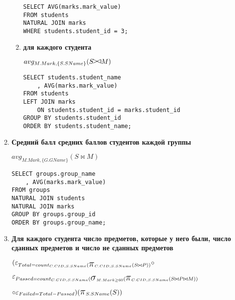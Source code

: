 \documentclass[12pt]{article}
\newcommand{\select}{\mbox{\Large$\sigma$}}
\newcommand{\rightsemijoin}{\mbox{$\mathrel{\raise1pt\hbox{\hskip-1.5pt$>$\hskip -2.5pt$<$\hskip -1.1pt\vrule height5pt
depth0pt width0.6pt}}$}}
\newcommand{\project}{\mbox{\Large$\pi$}}
\begin{document}
\begin{enumerate}
\begin{enumerate}
				\begin{verbatim}
SELECT AVG(marks.mark_value) 
FROM students
NATURAL JOIN marks
WHERE students.student_id = 3;
				\end{verbatim}

   			
   			\item \textbf{для каждого студента}
   			
				$ avg_{M.Mark, \{S.SName\}} (S \rightsemijoin M) $   			
								
				\begin{verbatim}
SELECT students.student_name
	, AVG(marks.mark_value) 
FROM students 
LEFT JOIN marks
	ON students.student_id = marks.student_id
GROUP BY students.student_id
ORDER BY students.student_name;
				\end{verbatim}
   			
		\end{enumerate}	
    
    
    \item \textbf{Средний балл средних баллов студентов каждой группы}
    
		$ avg_{M.Mark, \{G.GName\}} (S \bowtie M) $   			    
    
		\begin{verbatim}
SELECT groups.group_name
	, AVG(marks.mark_value) 
FROM groups
NATURAL JOIN students
NATURAL JOIN marks
GROUP BY groups.group_id
ORDER BY groups.group_name;
		\end{verbatim}
    
    
    \item \textbf{Для каждого студента число предметов, которые у него были, число сданных предметов и число не сданных предметов}

		$ (\varepsilon_{Total = count_{C.CID, S.SName} (\project_{C.CID, S.SName} (S \bowtie P))} \circ$
		
		
		$\varepsilon_{Passed = count_{C.CID, S.SName} (\select_{M.Mark \ge 60} (\project_{C.CID, S.SName} (S \bowtie P \bowtie M))} $
		
		$\circ \varepsilon_{Failed=Total - Passed}) (\project_{S.SName} (S))$   			    		
		\begin{verbatim}

		\end{verbatim}


\end{enumerate}
\end{document}

